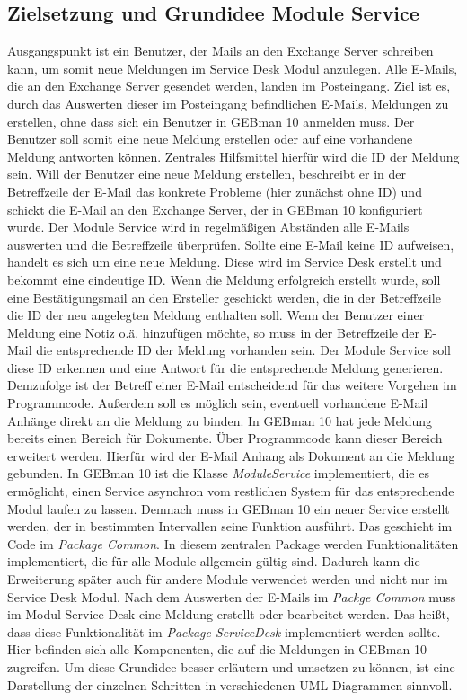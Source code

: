 \subsection{Zielsetzung und Grundidee Module Service }
\noindent
Ausgangspunkt ist ein Benutzer, der Mails an den Exchange Server schreiben kann, um somit neue Meldungen im Service Desk Modul anzulegen. Alle E-Mails, die an den Exchange Server gesendet werden, landen im Posteingang. Ziel ist es, durch das Auswerten dieser im Posteingang befindlichen E-Mails, Meldungen zu erstellen, ohne dass sich ein Benutzer in GEBman 10 anmelden muss. Der Benutzer soll somit eine neue Meldung erstellen oder auf eine vorhandene Meldung antworten können. Zentrales Hilfsmittel hierfür wird die ID der Meldung sein. Will der Benutzer eine neue Meldung erstellen, beschreibt er in der Betreffzeile der E-Mail das konkrete Probleme (hier zunächst ohne ID) und schickt die E-Mail an den Exchange Server, der in GEBman 10 konfiguriert wurde. Der Module Service wird in regelmäßigen Abständen alle E-Mails auswerten und die Betreffzeile überprüfen. Sollte eine E-Mail keine ID  aufweisen, handelt es sich um eine neue Meldung. Diese wird im Service Desk erstellt und bekommt eine eindeutige ID. Wenn die Meldung erfolgreich erstellt wurde, soll eine Bestätigungsmail an den Ersteller geschickt werden, die in der Betreffzeile die ID der neu angelegten Meldung enthalten soll.\newline
Wenn der Benutzer einer Meldung eine Notiz o.ä. hinzufügen möchte, so muss in der Betreffzeile der E-Mail die entsprechende ID der Meldung vorhanden sein. Der Module Service soll diese ID erkennen und eine Antwort für die entsprechende Meldung generieren. Demzufolge ist der Betreff einer E-Mail entscheidend für das weitere Vorgehen im Programmcode.\newline
Außerdem soll es möglich sein, eventuell vorhandene E-Mail Anhänge direkt an die Meldung zu binden. In GEBman 10 hat jede Meldung bereits einen Bereich für Dokumente. Über Programmcode kann dieser Bereich erweitert werden. Hierfür wird der E-Mail Anhang als Dokument an die Meldung gebunden.\newline 
In GEBman 10 ist die Klasse \textit{ModuleService} implementiert, die es ermöglicht, einen Service asynchron vom restlichen System für das entsprechende Modul laufen zu lassen. Demnach muss in GEBman 10 ein neuer Service erstellt werden, der in bestimmten Intervallen seine Funktion ausführt. Das geschieht im Code im \textit{Package Common}. In diesem zentralen Package werden Funktionalitäten implementiert, die für alle Module allgemein gültig sind. Dadurch kann die Erweiterung später auch für andere Module verwendet werden und nicht nur im Service Desk Modul.\newline
Nach dem Auswerten der E-Mails im \textit{Packge Common} muss im Modul Service Desk eine Meldung erstellt oder bearbeitet werden. Das heißt, dass diese Funktionalität im \textit{Package ServiceDesk} implementiert werden sollte. Hier befinden sich alle Komponenten, die auf die Meldungen in GEBman 10 zugreifen.\newline
Um diese Grundidee besser erläutern und umsetzen zu können, ist eine Darstellung der einzelnen Schritten in verschiedenen UML-Diagrammen sinnvoll.

